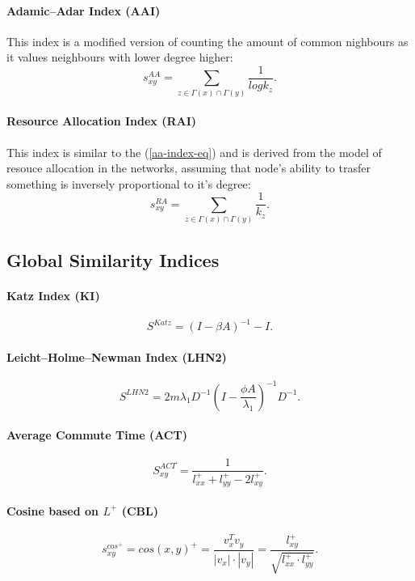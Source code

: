 \documentclass{llncs}
\begin{document}
\paragraph{Adamic–Adar Index (AAI) \cite{aa-index}}
%
This index is a modified version of counting the amount of common nighbours as it values neighbours with lower degree higher:
\begin{equation}
s_{xy}^{AA} = \sum_{z \in \Gamma(x) \cap \Gamma(y)} \frac{1}{log k_z}.
\label{aa-index-eq}
\end{equation}
%
\paragraph{Resource Allocation Index (RAI) \cite{rai-index}}
%
This index is similar to the (\ref{aa-index-eq}) and is derived from the model of resouce allocation in the networks, assuming that node's ability to trasfer something is inversely proportional to it's degree:
\begin{equation}
s_{xy}^{RA} = \sum_{z \in \Gamma(x) \cap \Gamma(y)} \frac{1}{k_z}.
\end{equation}
%
\subsection{Global Similarity Indices}
%
\paragraph{Katz Index (KI) \cite{katz-index}}
%
\begin{equation}
S^{Katz} = (I - \beta A)^{-1} - I.
\end{equation}
%
\paragraph{Leicht–Holme–Newman Index (LHN2) \cite{lhn1-index}}
%
\begin{equation}
S^{LHN2} = 2 m \lambda_1 D^{-1} (I - \frac{\phi A}{\lambda_1})^{-1} D^{-1}.
\end{equation}
%
\paragraph{Average Commute Time (ACT)}
%
\begin{equation}
S_{xy}^{ACT} = \frac{1}{l_{xx}^{+} + l_{yy}^{+} - 2l_{xy}^{+}}.
\end{equation}
%
\paragraph{Cosine based on $L^+$ (CBL)}
%
\begin{equation}
s_{xy}^{cos^{+}} = cos(x, y)^{+} = \frac{v_x^T v_y}{|v_x| \cdot |v_y|} = \frac{l_{xy}^{+}}{\sqrt{l_{xx}^{+}\cdot l_{yy}^{+}}}.
\end{equation}
%
\end{document}
